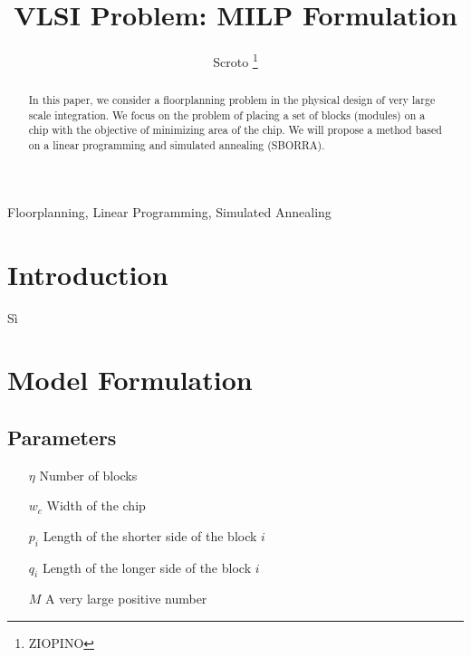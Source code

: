\documentclass[english]{sbrt}
\begin{document}
\title{VLSI Problem: MILP Formulation}

\author{Scroto 
\thanks{ZIOPINO }%
}

\maketitle


\begin{abstract}
In this paper, we consider a floorplanning problem
in the physical design of very large scale integration. We focus
on the problem of placing a set of blocks (modules) on a chip
with the objective of minimizing area of the chip. We will propose a method based on a linear programming and simulated annealing (SBORRA).  
\end{abstract}
\begin{keywords}
Floorplanning, Linear Programming, Simulated Annealing
\end{keywords}


\section{Introduction}

Sì

\section{Model Formulation}

\subsection{Parameters}
\begin{enumerate}
\item[$\eta$] Number of blocks
\item[$w_c$] Width of the chip
\item[$p_i$] Length of the shorter side of the block $i$
\item[$q_i$] Length of the longer side of the block $i$
\item[$M$] A very large positive number
\end{enumerate}
\end{document}

